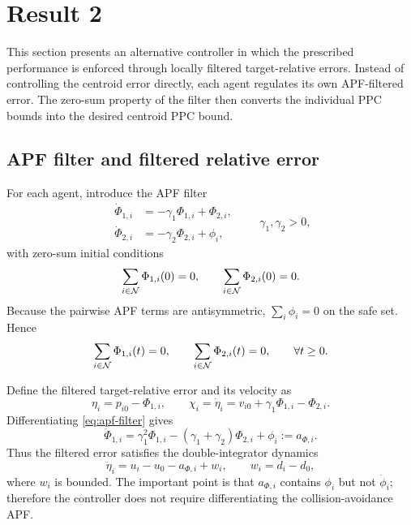 \section{Result 2}
\label{sec:result2}

This section presents an alternative controller in which the prescribed
performance is enforced through locally filtered target-relative errors.
Instead of controlling the centroid error directly, each agent regulates its
own APF-filtered error.  The zero-sum property of the filter then converts
the individual PPC bounds into the desired centroid PPC bound.

\subsection{APF filter and filtered relative error}

For each agent, introduce the APF filter
\begin{equation}
\begin{aligned}
\dot{\Phi}_{1,i}&=-\gamma_1\Phi_{1,i}+\Phi_{2,i},\\
\dot{\Phi}_{2,i}&=-\gamma_2\Phi_{2,i}+\phi_i,
\end{aligned}
\qquad \gamma_1,\gamma_2>0,
\label{eq:apf-filter}
\end{equation}
with zero-sum initial conditions
\[
\sum_{i\in\mathcal{N}}\Phi_{1,i}(0)=0,\qquad
\sum_{i\in\mathcal{N}}\Phi_{2,i}(0)=0.
\]
Because the pairwise APF terms are antisymmetric, $\sum_i\phi_i=0$ on the
safe set. Hence
\[
\sum_{i\in\mathcal{N}}\Phi_{1,i}(t)=0,\qquad
\sum_{i\in\mathcal{N}}\Phi_{2,i}(t)=0,\qquad \forall t\ge0.
\]

Define the filtered target-relative error and its velocity as
\begin{equation}
\eta_i=p_{i0}-\Phi_{1,i},\qquad
\chi_i=\dot\eta_i=v_{i0}+\gamma_1\Phi_{1,i}-\Phi_{2,i}.
\label{eq:eta-chi}
\end{equation}
Differentiating \eqref{eq:apf-filter} gives
\begin{equation}
\ddot{\Phi}_{1,i}
=\gamma_1^2\Phi_{1,i}-(\gamma_1+\gamma_2)\Phi_{2,i}+\phi_i
:=a_{\Phi,i}.
\label{eq:aPhi}
\end{equation}
Thus the filtered error satisfies the double-integrator dynamics
\begin{equation}
\ddot\eta_i
=u_i-u_0-a_{\Phi,i}+w_i,\qquad
w_i=d_i-d_0,
\label{eq:eta-dyn}
\end{equation}
where $w_i$ is bounded.  The important point is that $a_{\Phi,i}$ contains
$\phi_i$ but not $\dot\phi_i$; therefore the controller does not require
differentiating the collision-avoidance APF.

